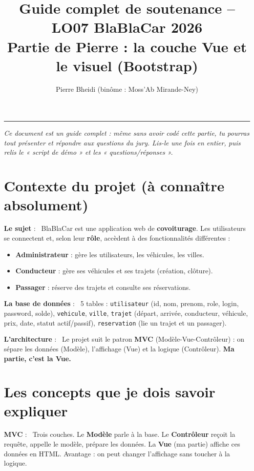 \documentclass[11pt,a4paper]{article}
\title{\textbf{Guide complet de soutenance -- LO07 BlaBlaCar 2026}\\[0.3em]\large Partie de Pierre : la couche \textbf{Vue} et le visuel (Bootstrap)}
\author{Pierre Bheidi \quad (binôme : Moss'Ab Mirande-Ney)}
\date{}
\newcommand{\motcle}[1]{\noindent\textbf{\color{bleu}#1} :\ }
\begin{document}
\maketitle
\tableofcontents
\vspace{1em}
\hrule
\vspace{1em}

\noindent\textit{Ce document est un guide complet : même sans avoir codé cette
partie, tu pourras tout présenter et répondre aux questions du jury. Lis-le une
fois en entier, puis relis le « script de démo » et les « questions/réponses ».}

\section{Contexte du projet (à connaître absolument)}

\motcle{Le sujet} BlaBlaCar est une application web de \textbf{covoiturage}. Les
utilisateurs se connectent et, selon leur \textbf{rôle}, accèdent à des
fonctionnalités différentes :
\begin{itemize}[noitemsep]
  \item \textbf{Administrateur} : gère les utilisateurs, les véhicules, les villes.
  \item \textbf{Conducteur} : gère ses véhicules et ses trajets (création, clôture).
  \item \textbf{Passager} : réserve des trajets et consulte ses réservations.
\end{itemize}

\motcle{La base de données} 5 tables : \texttt{utilisateur} (id, nom, prenom,
role, login, password, solde), \texttt{vehicule}, \texttt{ville},
\texttt{trajet} (départ, arrivée, conducteur, véhicule, prix, date, statut
actif/passif), \texttt{reservation} (lie un trajet et un passager).

\motcle{L'architecture} Le projet suit le patron \textbf{MVC}
(Modèle-Vue-Contrôleur) : on sépare les données (Modèle), l'affichage (Vue) et la
logique (Contrôleur). \textbf{Ma partie, c'est la Vue.}

\section{Les concepts que je dois savoir expliquer}

\motcle{MVC} Trois couches. Le \textbf{Modèle} parle à la base. Le
\textbf{Contrôleur} reçoit la requête, appelle le modèle, prépare les données. La
\textbf{Vue} (ma partie) affiche ces données en HTML. Avantage : on peut changer
l'affichage sans toucher à la logique.
\end{document}
